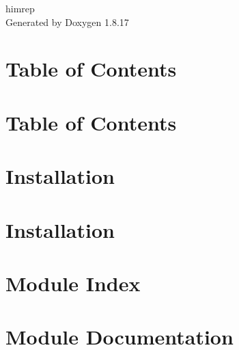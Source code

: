 \let\mypdfximage\pdfximage\def\pdfximage{\immediate\mypdfximage}\documentclass[twoside]{book}
\newcommand{\+}{\discretionary{\mbox{\scriptsize$\hookleftarrow$}}{}{}}
\newcommand{\clearemptydoublepage}{%
  \newpage{\pagestyle{empty}\cleardoublepage}%
}
\begin{document}
\begin{titlepage}
\vspace*{7cm}
\begin{center}%
{\Large himrep }\\
\vspace*{1cm}
{\large Generated by Doxygen 1.8.17}\\
\end{center}
\end{titlepage}
\clearemptydoublepage
{}
\tableofcontents
\clearemptydoublepage
{}

\chapter{Table of Contents}
\label{md__home_runner_work_himrep_himrep_gh-pages_modules_caffeCoder_README}

\chapter{Table of Contents}
\label{md__home_runner_work_himrep_himrep_gh-pages_modules_GIECoder_README}

\chapter{Installation}
\label{md__home_runner_work_himrep_himrep_gh-pages_modules_linearClassifierModule_README}

\chapter{Installation}
\label{md__home_runner_work_himrep_himrep_gh-pages_modules_sparseCoder_README}

\chapter{Module Index}

\chapter{Module Documentation}





\backmatter
\newpage
{}
\clearemptydoublepage
{}
\printindex
\end{document}
